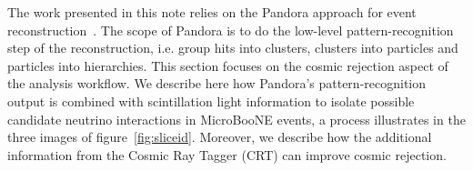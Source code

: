 
The work presented in this note relies on the Pandora approach for event reconstruction~\cite{bib:pandoraub}. The scope of Pandora is to do the low-level pattern-recognition step of the reconstruction, i.e. group hits into clusters, clusters into particles and particles into hierarchies. This section focuses on the cosmic rejection aspect of the analysis workflow. We describe here how Pandora's pattern-recognition output is combined with scintillation light information to isolate possible candidate neutrino interactions in MicroBooNE events, a process illustrates in the three images of figure~\ref{fig:sliceid}. Moreover, we describe how the additional information from the Cosmic Ray Tagger (CRT) can improve cosmic rejection. 

